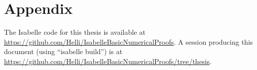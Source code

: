 \documentclass[11pt,a4paper,bibtotoc,idxtotoc,BCOR15mm,DIV10]{scrbook}
\begin{document}





\backmatter
\appendix
\chapter {Appendix}

The Isabelle code for this thesis is available at \url{https://github.com/Helli/IsabelleBasicNumericalProofs}. A session producing this document (using ``isabelle build'') is at \url{https://github.com/Helli/IsabelleBasicNumericalProofs/tree/thesis}.
\end{document}
